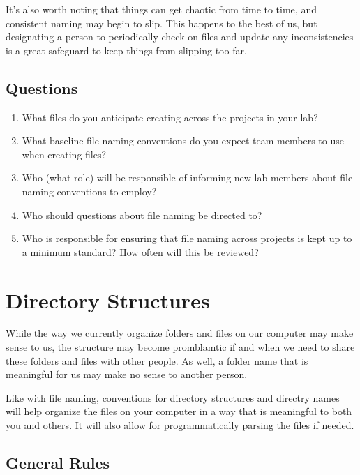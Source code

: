 \documentclass[
]{book}
\providecommand{\tightlist}{%
  \setlength{\itemsep}{0pt}\setlength{\parskip}{0pt}}
\begin{document}
It's also worth noting that things can get chaotic from time to time, and consistent naming may begin to slip. This happens to the best of us, but designating a person to periodically check on files and update any inconsistencies is a great safeguard to keep things from slipping too far.

\hypertarget{questions-1}{%
\section*{Questions}\label{questions-1}}

\begin{enumerate}
\def\labelenumi{\arabic{enumi}.}
\tightlist
\item
  What files do you anticipate creating across the projects in your lab?
\item
  What baseline file naming conventions do you expect team members to use when creating files?
\item
  Who (what role) will be responsible of informing new lab members about file naming conventions to employ?
\item
  Who should questions about file naming be directed to?
\item
  Who is responsible for ensuring that file naming across projects is kept up to a minimum standard? How often will this be reviewed?
\end{enumerate}

\hypertarget{directory-structures-1}{%
\chapter*{Directory Structures}\label{directory-structures-1}}

While the way we currently organize folders and files on our computer may make sense to us, the structure may become promblamtic if and when we need to share these folders and files with other people. As well, a folder name that is meaningful for us may make no sense to another person.

Like with file naming, conventions for directory structures and directry names will help organize the files on your computer in a way that is meaningful to both you and others. It will also allow for programmatically parsing the files if needed.

\hypertarget{general-rules-2}{%
\section*{General Rules}\label{general-rules-2}}
\end{document}
